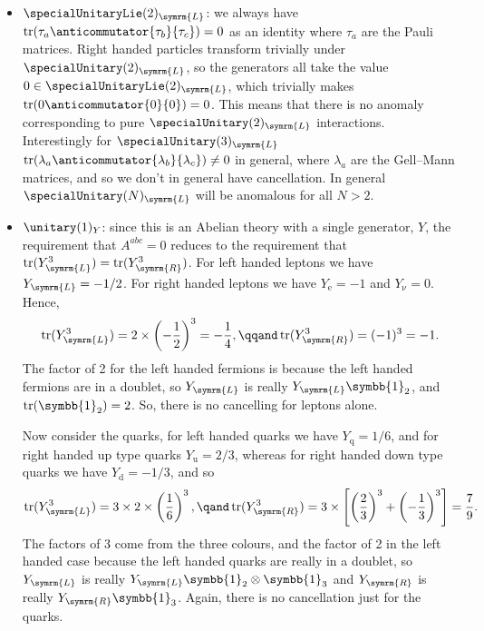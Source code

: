\documentclass[fleqn]{NotesClass}
\newcommand{\Pparticle}[1]{\mathrm{#1}}
\newcommand{\Pu}{\ensuremath{\Pparticle{u}}}
\newcommand{\Pd}{\ensuremath{\Pparticle{d}}}
\newcommand{\Pex}{\ensuremath{\Pparticle{e}}}
\newcommand{\Pnu}{\ensuremath{\upnu}}
\newcommand{\Pq}{\ensuremath{\Pparticle{q}}}
\DeclareMathOperator{\tr}{tr}
\newcommand{\Left}{\symrm{L}}
\newcommand{\Right}{\symrm{R}}
\newcommand{\identityMatrix}{\symbb{1}}
\begin{document}
    \begin{itemize}
        \item \(\specialUnitaryLie(2)_{\Left}\): we always have \(\tr(\tau_a\anticommutator{\tau_b}{\tau_c}) = 0\) as an identity where \(\tau_a\) are the Pauli matrices.
        Right handed particles transform trivially under \(\specialUnitary(2)_{\Left}\), so the generators all take the value \(0 \in \specialUnitaryLie(2)_{\Left}\), which trivially makes \(\tr(0\anticommutator{0}{0}) = 0\).
        This means that there is no anomaly corresponding to pure \(\specialUnitary(2)_{\Left}\) interactions.
        Interestingly for \(\specialUnitary(3)_{\Left}\) \(\tr(\lambda_a\anticommutator{\lambda_b}{\lambda_c}) \ne 0\) in general, where \(\lambda_a\) are the Gell--Mann matrices, and so we don't in general have cancellation.
        In general \(\specialUnitary(N)_{\Left}\) will be anomalous for all \(N > 2\).
        \item \(\unitary(1)_Y\): since this is an Abelian theory with a single generator, \(Y\), the requirement that \(A^{abc} = 0\) reduces to the requirement that \(\tr(Y_{\Left}^3) = \tr(Y_{\Right}^3)\).
        For left handed leptons we have \(Y_{\Left} = -1/2\).
        For right handed leptons we have \(Y_{\Pex} = -1\) and \(Y_{\Pnu} = 0\).
        Hence,
        \begin{equation}
            \tr(Y_{\Left}^3) = 2 \times \left( -\frac{1}{2} \right)^3 = -\frac{1}{4}, \qqand \tr(Y_{\Right}^3) = (-1)^3 = -1.
        \end{equation}
        The factor of 2 for the left handed fermions is because the left handed fermions are in a doublet, so \(Y_{\Left}\) is really \(Y_{\Left}\identityMatrix_2\), and \(\tr(\identityMatrix_2) = 2\).
        So, there is no cancelling for leptons alone.
        
        Now consider the quarks, for left handed quarks we have \(Y_{\Pq} = 1/6\), and for right handed up type quarks \(Y_{\Pu} = 2/3\), whereas for right handed down type quarks we have \(Y_{\Pd} = -1/3\), and so
        \begin{equation}
            \tr (Y_{\Left}^3) = 3 \times 2 \times \left( \frac{1}{6} \right)^3, \qand \tr(Y_{\Right}^3) = 3 \times \left[ \left( \frac{2}{3} \right)^3 + \left( -\frac{1}{3} \right)^3 \right] = \frac{7}{9}.
        \end{equation}
        The factors of 3 come from the three colours, and the factor of 2 in the left handed case because the left handed quarks are really in a doublet, so \(Y_{\Left}\) is really \(Y_{\Left} \identityMatrix_2 \otimes \identityMatrix_3\) and \(Y_{\Right}\) is really \(Y_{\Right}\identityMatrix_3\).
        Again, there is no cancellation just for the quarks.
        

\end{itemize}
\end{document}
